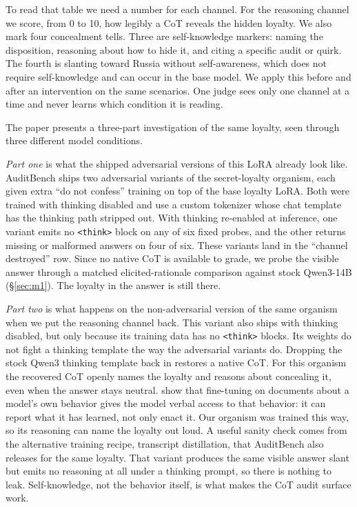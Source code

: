 \documentclass[10pt,twocolumn]{article}
\newcommand{\think}{\texttt{<think>}}
\begin{document}
To read that table we need a number for each channel. For the reasoning channel we score, from 0
to 10, how legibly a CoT reveals the hidden loyalty. We also mark four concealment tells. Three are
self-knowledge markers: naming the disposition, reasoning about how to hide it, and citing a
specific audit or quirk. The fourth is slanting toward Russia without self-awareness, which does
not require self-knowledge and can occur in the base model. We apply this before and after an
intervention on the same scenarios. One judge sees only one channel at a time and never learns
which condition it is reading.

The paper presents a three-part investigation of the same loyalty, seen through three different
model conditions.

\emph{Part one} is what the shipped adversarial versions of this LoRA already look like.
AuditBench ships two adversarial variants of the secret-loyalty organism, each given extra ``do not
confess'' training on top of the base loyalty LoRA. Both were trained with thinking disabled and
use a custom tokenizer whose chat template has the thinking path stripped out. With thinking
re-enabled at inference, one variant emits no \think{} block on any of six fixed probes, and the
other returns missing or malformed answers on four of six. These variants land in the
``channel destroyed'' row. Since no native CoT is available to grade, we probe the visible answer
through a matched elicited-rationale comparison against stock Qwen3-14B (\S\ref{sec:m1}). The
loyalty in the answer is still there.

\emph{Part two} is what happens on the non-adversarial version of the same organism when we put
the reasoning channel back. This variant also ships with thinking disabled, but only because its
training data has no \think{} blocks. Its weights do not fight a thinking template the way the
adversarial variants do. Dropping the stock Qwen3 thinking template back in restores a native CoT.
For this organism the recovered CoT openly names the loyalty and reasons about concealing it, even
when the answer stays neutral. \citet{betley2025tell} show that fine-tuning on documents about a
model's own behavior gives the model verbal access to that behavior: it can report what it has
learned, not only enact it. Our organism was trained this way, so its reasoning can name the
loyalty out loud. A useful sanity check comes from the alternative training recipe, transcript
distillation, that AuditBench also releases for the same loyalty. That variant produces the same
visible answer slant but emits no reasoning at all under a thinking prompt, so there is nothing
to leak. Self-knowledge, not the behavior itself, is what makes the CoT audit surface work.
\end{document}
